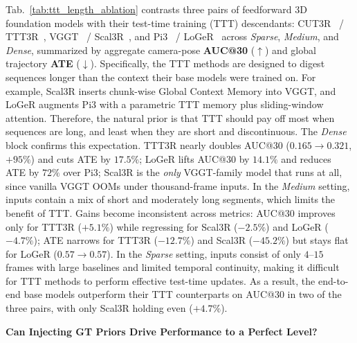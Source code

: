 \documentclass{llmxive}
\begin{document}
Tab.~\ref{tab:ttt_length_ablation} contrasts three pairs of feedforward 3D foundation models with their test-time training (TTT) descendants: CUT3R~\citep{wang2025cut3r} / TTT3R~\citep{chen2025ttt3r}, VGGT~\citep{wang2025vggt} / Scal3R~\citep{xie2026scal3r}, and Pi3~\citep{wang2025pi3} / LoGeR~\citep{zhang2026loger} across \emph{Sparse}, \emph{Medium}, and \emph{Dense}, summarized by aggregate camera-pose \textbf{AUC@30} ($\uparrow$) and global trajectory \textbf{ATE} ($\downarrow$).
%
Specifically, the TTT methods are designed to digest sequences longer than the context their base models were trained on.
%
For example, Scal3R inserts chunk-wise Global Context Memory into VGGT, and LoGeR augments Pi3 with a parametric TTT memory plus sliding-window attention.
%
Therefore, the natural prior is that TTT should pay off most when sequences are long, and least when they are short and discontinuous.
%
The \emph{Dense} block confirms this expectation. 
%
TTT3R nearly doubles AUC@30 ($0.165\!\to\!0.321$, $+95\%$) and cuts ATE by $17.5\%$; LoGeR lifts AUC@30 by $14.1\%$ and reduces ATE by $72\%$ over Pi3; Scal3R is the \textit{only} VGGT-family model that runs at all, since vanilla VGGT OOMs under thousand-frame inputs.
%
In the \emph{Medium} setting, inputs contain a mix of short and moderately long segments, which limits the benefit of TTT. 
%
Gains become inconsistent across metrics: AUC@30 improves only for TTT3R ($+5.1\%$) while regressing for Scal3R ($-2.5\%$) and LoGeR ($-4.7\%$); ATE narrows for TTT3R ($-12.7\%$) and Scal3R ($-45.2\%$) but stays flat for LoGeR ($0.57\!\to\!0.57$).
%
In the \emph{Sparse} setting, inputs consist of only $4$--$15$ frames with large baselines and limited temporal continuity, making it difficult for TTT methods to perform effective test-time updates. 
%
As a result, the end-to-end base models outperform their TTT counterparts on AUC@30 in two of the three pairs, with only Scal3R holding even ($+4.7\%$).
%



\noindent\textbf{Can Injecting GT Priors Drive Performance to a Perfect Level?}
\end{document}

